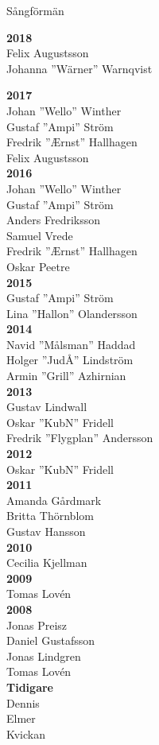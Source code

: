 \begin{flushleft}
{\Huge Sångförmän}
\end{flushleft}

{\large
\setlength{\parskip}{0.5em}
\setlength\columnsep{3em}

\begin{multicols}{2}
\textbf{2018}\\
Felix Augustsson\\
Johanna ''Wärner'' Warnqvist

\textbf{2017}\\
Johan ''Wello'' Winther\\
Gustaf ''Ampi'' Ström\\
Fredrik ''Ærnst'' Hallhagen\\
Felix Augustsson\\

\textbf{2016}\\
Johan ''Wello'' Winther\\
Gustaf ''Ampi'' Ström\\
Anders Fredriksson\\
Samuel Vrede\\
Fredrik ''Ærnst'' Hallhagen\\
Oskar Peetre\\

\textbf{2015}\\
Gustaf ''Ampi'' Ström\\
Lina ''Hallon'' Olandersson\\

\textbf{2014}\\
Navid ''Målsman'' Haddad\\
Holger ''JudÅ'' Lindström\\
Armin ''Grill'' Azhirnian\\

\textbf{2013}\\
Gustav Lindwall\\
Oskar ''KubN'' Fridell\\
Fredrik ''Flygplan'' Andersson\\

\textbf{2012}\\
Oskar ''KubN'' Fridell\\

\textbf{2011}\\
Amanda Gårdmark\\
Britta Thörnblom\\
Gustav Hansson\\

\textbf{2010}\\
Cecilia Kjellman\\

\textbf{2009}\\
Tomas Lovén\\

\textbf{2008}\\
Jonas Preisz\\
Daniel Gustafsson\\
Jonas Lindgren\\
Tomas Lovén\\

\textbf{Tidigare}\\
Dennis\\
Elmer\\
Kvickan\\

\end{multicols}
}
